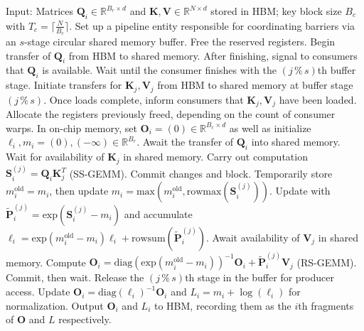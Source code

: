 \begin{enumerate}
\begin{algorithm}[H]
    \caption{\small\label{alg:flash3_wgmma_ws_only}\textsc{FlashAttention-3} forward pass \textbf{excluding} intra-consumer overlap -- CTA perspective}
    \begin{algorithmic}[1]
\REQUIRE Input: Matrices $\mathbf{Q}_i \in \mathbb{R}^{B_r \times d}$ and $\mathbf{K}, \mathbf{V} \in \mathbb{R}^{N \times d}$ stored in HBM; key block size $B_c$ with $T_c = \lceil \frac{N}{B_c} \rceil$.
\STATE Set up a pipeline entity responsible for coordinating barriers via an $s$-stage circular shared memory buffer.
\STATE Free the reserved registers.
\STATE Begin transfer of $\mathbf{Q}_i$ from HBM to shared memory.
\STATE After finishing, signal to consumers that $\mathbf{Q}_i$ is available.
    \STATE Wait until the consumer finishes with the $(j\,\%\,s)$th buffer stage.
    \STATE Initiate transfers for $\mathbf{K}_j, \mathbf{V}_j$ from HBM to shared memory at buffer stage $(j\,\%\,s)$.
    \STATE Once loads complete, inform consumers that $\mathbf{K}_j, \mathbf{V}_j$ have been loaded.
\ENDFOR
\ELSE \STATE Allocate the registers previously freed, depending on the count of consumer warps.
\STATE In on-chip memory, set $\mathbf{O}_i = (0) \in \mathbb{R}^{B_r \times d}$ as well as initialize $\ell_i, m_i = (0), (-\infty) \in \mathbb{R}^{B_r}$.
\STATE Await the transfer of $\mathbf{Q}_i$ into shared memory.
\STATE Wait for availability of $\mathbf{K}_j$ in shared memory.
\STATE Carry out computation $\mathbf{S}_i^{(j)} = \mathbf{Q}_i \mathbf{K}_j^T$ (SS-GEMM). Commit changes and block. \label{alg:ws_only_gemm1}
\STATE Temporarily store $m_i^{\mathrm{old}} = m_i$, then update $m_i = \mathrm{max}(m_i^{\mathrm{old}}, \mathrm{rowmax}(\mathbf{S}_i^{(j)}))$. \label{code-ws:softmax_start}
\STATE Update with $\widetilde{\mathbf{P}}_i^{(j)} = \mathrm{exp}(\mathbf{S}_i^{(j)} - m_i)$ and accumulate $\ell_i = \mathrm{exp}(m_i^{\mathrm{old}} - m_i) \ell_i + \mathrm{rowsum}(\widetilde{\mathbf{P}}_i^{(j)})$. \label{code-ws:softmax_end}
\STATE Await availability of $\mathbf{V}_j$ in shared memory.
\STATE Compute $\mathbf{O}_i = \mathrm{diag}(\mathrm{exp}(m_i^{\mathrm{old}} - m_i))^{-1} \mathbf{O}_i + \widetilde{\mathbf{P}}_i^{(j)} \mathbf{V}_j$ (RS-GEMM). Commit, then wait. \label{alg:ws_only_gemm2}
\STATE Release the $(j\,\%\,s)$th stage in the buffer for producer access.
\ENDFOR
\STATE Update $\mathbf{O}_i = \mathrm{diag}(\ell_i)^{-1} \mathbf{O}_i$ and $L_i = m_i + \log(\ell_i)$ for normalization.
\STATE Output $\mathbf{O}_i$ and $L_i$ to HBM, recording them as the $i$th fragments of $\mathbf{O}$ and $L$ respectively.
\ENDIF
\end{algorithmic}
\end{algorithm}


\end{enumerate}
